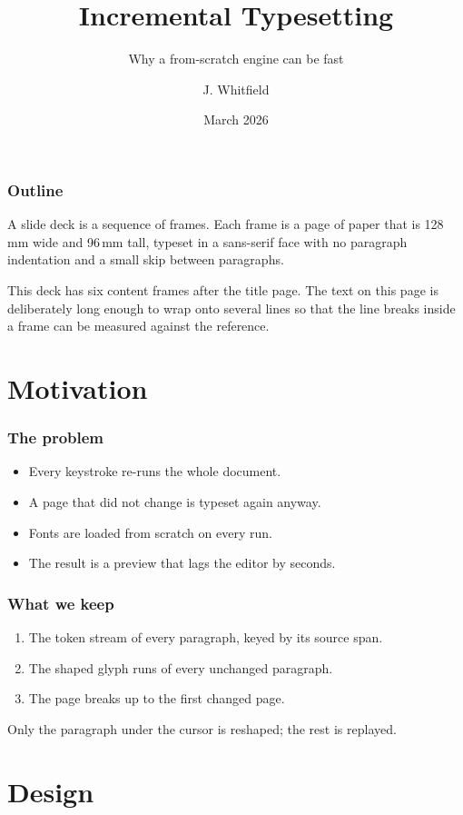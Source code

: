 \documentclass{beamer}
\title{Incremental Typesetting}
\subtitle{Why a from-scratch engine can be fast}
\author{J. Whitfield}
\institute{FlashTeX corpus}
\date{March 2026}
\begin{document}
\begin{frame}
  \titlepage
\end{frame}

\begin{frame}
  \frametitle{Outline}
  A slide deck is a sequence of frames. Each frame is a page of paper that is
  128\,mm wide and 96\,mm tall, typeset in a sans-serif face with no paragraph
  indentation and a small skip between paragraphs.

  This deck has six content frames after the title page. The text on this
  page is deliberately long enough to wrap onto several lines so that the
  line breaks inside a frame can be measured against the reference.
\end{frame}

\section{Motivation}

\begin{frame}
  \frametitle{The problem}
  \begin{itemize}
    \item Every keystroke re-runs the whole document.
    \item A page that did not change is typeset again anyway.
    \item Fonts are loaded from scratch on every run.
    \item The result is a preview that lags the editor by seconds.
  \end{itemize}
\end{frame}

\begin{frame}
  \frametitle{What we keep}
  \begin{enumerate}
    \item The token stream of every paragraph, keyed by its source span.
    \item The shaped glyph runs of every unchanged paragraph.
    \item The page breaks up to the first changed page.
  \end{enumerate}

  Only the paragraph under the cursor is reshaped; the rest is replayed.
\end{frame}

\section{Design}
\end{document}
